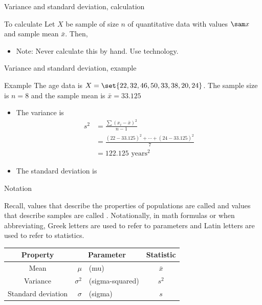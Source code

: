 \documentclass[xcolor=table, aspectratio=169, bigger]{beamer}
\begin{document}
\begin{frame}{Variance and standard deviation, calculation}
\begin{block}{To calculate}
Let $X$ be sample of size $n$ of quantitative data with values $\sam x$ and sample mean $\bar x$. Then,\\
\smallskip
{}
\begin{itemize}
\pause\item Note: Never calculate this by hand. Use technology.
\end{itemize}
\end{block}
\end{frame}

\begin{frame}{Variance and standard deviation, example}
\begin{exampleblock}{Example}
The age data is $X = \set{22, 32, 46, 50, 33, 38, 20, 24}$. The sample size is $n=8$ and the sample mean is $\bar x = 33.125$
\begin{itemize}
\pause
\item The variance is \vspace{-.1in}
\begin{align*}
s^2 &= \frac{\sum (x_i - \bar x)^2}{n-1}\\
&= \frac{(22-33.125)^2 + \cdots + (24-33.125)^2}{7}\\
&= 122.125 \text{ years}^\text{2}
\end{align*} \vspace{-.2in}
\pause\item The standard deviation is\\ \smallskip
{}
\end{itemize}
\smallskip
\end{exampleblock}
\end{frame}


\begin{frame}{Notation}
\begin{block}{}
Recall, values that describe the properties of populations are called  and values that describe samples are called . Notationally, in math formulas or when abbreviating, Greek letters are used to refer to parameters and Latin letters are used to refer to statistics.
\pause
\begin{center}
\begin{tabular}{c |r l | c}
Property & \multicolumn{2}{c|}{Parameter} & Statistic\\
\hline
Mean & $\mu$ & (mu) & $\bar x$\\
Variance & $\sigma^2$ &(sigma-squared) & $s^2$\\
Standard deviation & $\sigma$ &(sigma) & $s$
\end{tabular}
\end{center} 
\end{block}
\end{frame}
\end{document}
